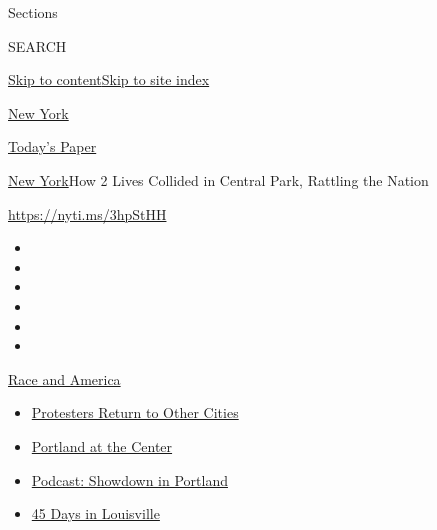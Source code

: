 Sections

SEARCH

\protect\hyperlink{site-content}{Skip to
content}\protect\hyperlink{site-index}{Skip to site index}

\href{https://www.nytimes3xbfgragh.onion/section/nyregion}{New York}

\href{https://myaccount.nytimes3xbfgragh.onion/auth/login?response_type=cookie\&client_id=vi}{}

\href{https://www.nytimes3xbfgragh.onion/section/todayspaper}{Today's
Paper}

\href{/section/nyregion}{New York}\textbar{}How 2 Lives Collided in
Central Park, Rattling the Nation

\url{https://nyti.ms/3hpStHH}

\begin{itemize}
\item
\item
\item
\item
\item
\item
\end{itemize}

\href{https://www.nytimes3xbfgragh.onion/news-event/george-floyd-protests-minneapolis-new-york-los-angeles?action=click\&pgtype=Article\&state=default\&region=TOP_BANNER\&context=storylines_menu}{Race
and America}

\begin{itemize}
\tightlist
\item
  \href{https://www.nytimes3xbfgragh.onion/2020/07/26/us/protests-portland-seattle-trump.html?action=click\&pgtype=Article\&state=default\&region=TOP_BANNER\&context=storylines_menu}{Protesters
  Return to Other Cities}
\item
  \href{https://www.nytimes3xbfgragh.onion/2020/07/24/us/portland-oregon-protests-white-race.html?action=click\&pgtype=Article\&state=default\&region=TOP_BANNER\&context=storylines_menu}{Portland
  at the Center}
\item
  \href{https://www.nytimes3xbfgragh.onion/2020/07/23/podcasts/the-daily/portland-protests.html?action=click\&pgtype=Article\&state=default\&region=TOP_BANNER\&context=storylines_menu}{Podcast:
  Showdown in Portland}
\item
  \href{https://www.nytimes3xbfgragh.onion/interactive/2020/07/16/us/black-lives-matter-protests-louisville-breonna-taylor.html?action=click\&pgtype=Article\&state=default\&region=TOP_BANNER\&context=storylines_menu}{45
  Days in Louisville}
\end{itemize}

